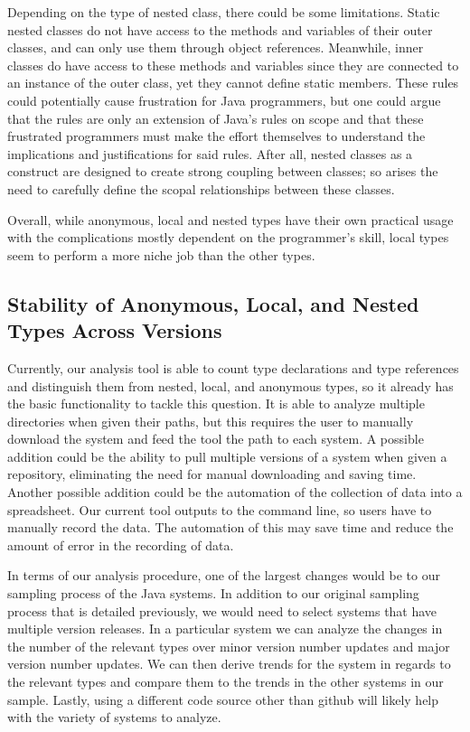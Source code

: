 \documentclass[12p]{article}
\begin{document}
Depending on the type of nested class, there could be some limitations. Static nested classes do not have access to the methods and variables of their outer classes, and can only use them through object references. Meanwhile, inner classes do have access to these methods and variables since they are connected to an instance of the outer class, yet they cannot define static members. These rules could potentially cause frustration for Java programmers, but one could argue that the rules are only an extension of Java’s rules on scope and that these frustrated programmers must make the effort themselves to understand the implications and justifications for said rules. After all, nested classes as a construct are designed to create strong coupling between classes; so arises the need to carefully define the scopal relationships between these classes.

Overall, while anonymous, local and nested types have their own practical usage with the complications mostly dependent on the programmer’s skill, local types seem to perform a more niche job than the other types.

\subsection{Stability of Anonymous, Local, and Nested Types Across Versions}

Currently, our analysis tool is able to count type declarations and type references and distinguish them from nested, local, and anonymous types, so it already has the basic functionality to tackle this question. It is able to analyze multiple directories when given their paths, but this requires the user to manually download the system and feed the tool the path to each system. A possible addition could be the ability to pull multiple versions of a system when given a repository, eliminating the need for manual downloading and saving time. Another possible addition could be the automation of the collection of data into a spreadsheet. Our current tool outputs to the command line, so users have to manually record the data. The automation of this may save time and reduce the amount of error in the recording of data.

In terms of our analysis procedure, one of the largest changes would be to our sampling process of the Java systems. In addition to our original sampling process that is detailed previously, we would need to select systems that have multiple version releases. In a particular system we can analyze the changes in the number of the relevant types over minor version number updates and major version number updates. We can then derive trends for the system in regards to the relevant types and compare them to the trends in the other systems in our sample. Lastly, using a different code source other than github will likely help with the variety of systems to analyze.
\end{document}
